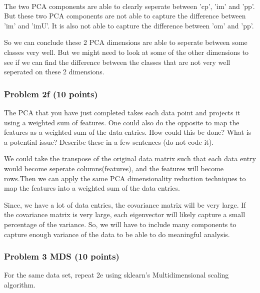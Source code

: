 \documentclass[11pt]{article}
\begin{document}
    \begin{center}
    \end{center}
    { \hspace*{\fill} \\}
    
    The two PCA components are able to clearly seperate between 'cp', 'im'
and 'pp'. But these two PCA components are not able to capture the
difference between 'im' and 'imU'. It is also not able to capture the
difference between 'om' and 'pp'.

So we can conclude these 2 PCA dimensions are able to seperate between
some classes very well. But we might need to look at some of the other
dimensions to see if we can find the difference between the classes that
are not very well seperated on these 2 dimensions.

    \subsubsection{Problem 2f (10 points)}\label{problem-2f-10-points}

The PCA that you have just completed takes each data point and projects
it using a weighted sum of features. One could also do the opposite to
map the features as a weighted sum of the data entries. How could this
be done? What is a potential issue? Describe these in a few sentences
(do not code it).

    We could take the transpose of the original data matrix such that each
data entry would become seperate columns(features), and the features
will become rows.Then we can apply the same PCA dimensionality reduction
techniques to map the features into a weighted sum of the data entries.

Since, we have a lot of data entries, the covariance matrix will be very
large. If the covariance matrix is very large, each eigenvector will
likely capture a small percentage of the variance. So, we will have to
include many components to capture enough variance of the data to be
able to do meaningful analysis.

    \subsubsection{Problem 3 MDS (10 points)}\label{problem-3-mds-10-points}

For the same data set, repeat 2e using sklearn's Multidimensional
scaling algorithm.
\end{document}
